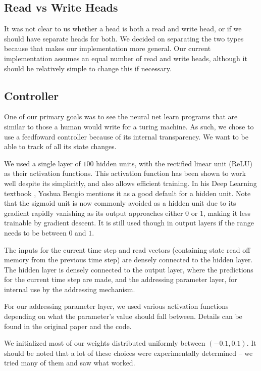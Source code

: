 \documentclass[12pt]{article}
\begin{document}
\subsection{Read vs Write Heads}

It was not clear to us whether a head is both a read and write head, or if we
should have separate heads for both. We decided on separating the two types
because that makes our implementation more general.
Our current implementation assumes an equal number of read and write heads,
although it should be relatively simple to change this if necessary.

\subsection{Controller}

One of our primary goals was to see the neural net learn programs that are
similar to those a human would write for a turing machine. As such, we chose
to use a feedfoward controller because of its internal transparency. We want
to be able to track of all its state changes.

We used a single layer of $100$ hidden units, with the rectified linear unit (ReLU)
as their activation functions. This activation function has been shown to work
well despite its simplicitly, and also allows efficient training.
In his Deep Learning textbook \cite{Goodfellow-et-al-2016-Book}, Yoshua Bengio
mentions it as a good default for a hidden unit. Note that the sigmoid unit is now
commonly avoided as a hidden unit due to its gradient rapidly vanishing
as its output approaches either $0$ or $1$, making it less trainable by gradient
descent. It is still used though in output layers if the range needs to be between
$0$ and $1$.

The inputs for the current time step and read vectors (containing state read off
memory from the previous time step) are densely connected to the
hidden layer. The hidden layer is densely connected to the output layer, where the
predictions for the current time step are made, and the addressing parameter layer,
for internal use by the addressing mechanism.

For our addressing parameter layer, we used various activation functions depending
on what the parameter's value should fall between. Details can be found in
the original paper and the code.

We initialized most of our weights distributed uniformly between $(-0.1, 0.1)$.
It should be noted that a lot of these choices were experimentally determined -- we 
tried many of them and saw what worked.
\end{document}
